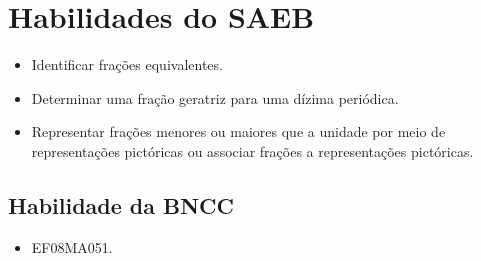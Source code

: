 \section*{Habilidades do SAEB}

\begin{itemize}
\item
    Identificar frações equivalentes.
\item
    Determinar uma fração geratriz para uma dízima periódica.
\item
    Representar frações menores ou maiores que a
    unidade por meio de representações pictóricas ou associar frações a
    representações pictóricas.
\end{itemize}

\subsection{Habilidade da BNCC}

\begin{itemize}
  \item EF08MA051.
\end{itemize}

